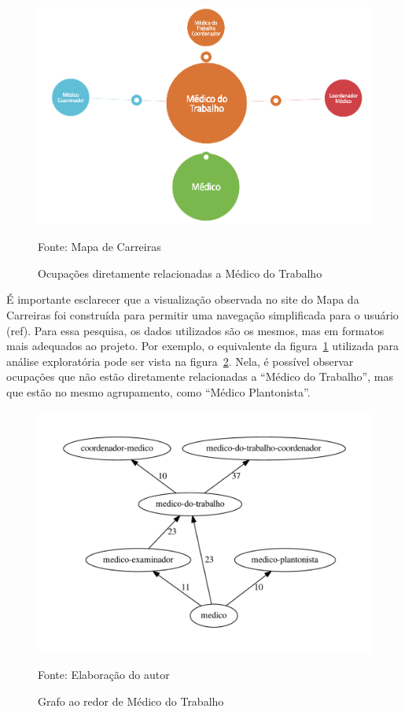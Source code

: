\documentclass[12pt,a4paper,final]{article}
\newcommand{\source}[1]{\vspace{-10pt} \caption*{Fonte: {#1}} }
\begin{document}
\begin{figure}[ht]
  \centering
  \includegraphics[scale=0.25]{mapa-medico-do-trabalho.png}
  \caption{Ocupações diretamente relacionadas a Médico do Trabalho}
  \source{Mapa de Carreiras}
  \label{fig:exemplo-medico-do-trabalho}
\end{figure}


É importante esclarecer que a visualização observada no site do Mapa da Carreiras foi construída para permitir uma navegação simplificada para o usuário (ref). Para essa pesquisa, os dados utilizados são os mesmos, mas em formatos mais adequados ao projeto. Por exemplo, o equivalente da figura~\ref{fig:exemplo-medico-do-trabalho} utilizada para análise exploratória pode ser vista na figura~\ref{fig:grafo-medico-do-trabalho}. Nela, é possível observar ocupações que não estão diretamente relacionadas a \enquote{Médico do Trabalho}, mas que estão no mesmo agrupamento, como \enquote{Médico Plantonista}.

\begin{figure}[ht]
  \centering
  \includegraphics[scale=0.6]{cluster_24.pdf}
  \caption{Grafo ao redor de Médico do Trabalho}
  \source{Elaboração do autor}
  \label{fig:grafo-medico-do-trabalho}
\end{figure}
\end{document}
